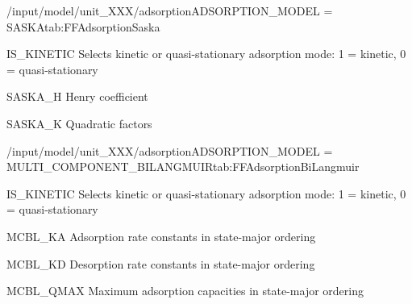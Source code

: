 \begin{condsubgroup}{/input/model/unit\_XXX/adsorption}{ADSORPTION\_MODEL = SASKA}{tab:FFAdsorptionSaska}
\begin{dataset}[type=int,range={$\{ 0,1 \}$},length=1]{IS\_KINETIC}
    Selects kinetic or quasi-stationary adsorption mode: 1 = kinetic, 0 = quasi-stationary
  \end{dataset}
  \begin{dataset}[unit=\si{\cubic\metre\of{MP}\per\cubic\metre\of{SP}\per\second}, type=double,range={$\mathds{R}$},length={\texttt{NCOMP}}]{SASKA\_H}
    Henry coefficient
  \end{dataset}
  \begin{dataset}[unit=\si{\raiseto{6}\metre\of{MP}\per\cubic\metre\of{SP}\per\mol\per\second}, type=double,range={$\mathds{R}$},length={$\texttt{NCOMP}^2$}]{SASKA\_K}
    Quadratic factors
  \end{dataset}
\end{condsubgroup}

\begin{condsubgroup}{/input/model/unit\_XXX/adsorption}{ADSORPTION\_MODEL = MULTI\_COMPONENT\_BILANGMUIR}{tab:FFAdsorptionBiLangmuir}
\begin{dataset}[type=int,range={$\{ 0,1 \}$},length=1]{IS\_KINETIC}
    Selects kinetic or quasi-stationary adsorption mode: 1 = kinetic, 0 = quasi-stationary
  \end{dataset}
  \begin{dataset}[unit=\si{\cubic\metre\of{MP}\per\mol\per\second}, type=double,range={$\geq 0$},length={$\texttt{NSTATES} \cdot \texttt{NCOMP}$}]{MCBL\_KA}
    Adsorption rate constants in state-major ordering
  \end{dataset}
  \begin{dataset}[unit=\si{\per\second}, type=double,range={$\geq 0$},length={$\texttt{NSTATES} \cdot \texttt{NCOMP}$}]{MCBL\_KD}
    Desorption rate constants in state-major ordering
  \end{dataset}
  \begin{dataset}[unit=\si{\mol\per\cubic\metre\of{SP}}, type=double,range={$> 0.0$},length={$\texttt{NSTATES} \cdot \texttt{NCOMP}$}]{MCBL\_QMAX}
    Maximum adsorption capacities in state-major ordering
  \end{dataset}
\end{condsubgroup}

